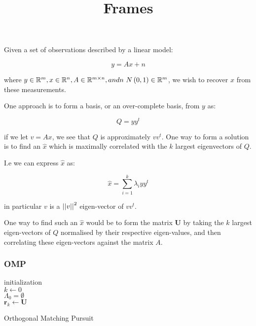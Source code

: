 \documentclass{article}
\title{Frames}
\begin{document}
\maketitle

Given a set of observations described by a linear model:

\begin{equation}
y = Ax + n 
\end{equation}

where \(y \in {\mathbb{R}}^{m}, x\in {\mathbb{R}}^n, A \in {\mathbb{R}}^{m \times n}, and n ~ N\left(0,1\right) \in {\mathbb{R}}^m\), we wish to recover \(x\) from these measurements. 

One approach is to form a basis, or an over-complete basis, from \(y\) as:

\begin{equation}
Q = yy^t
\end{equation}

if we let \(v = Ax\), we see that \(Q\) is approximately \(vv^t\). One way to form a solution is to find an \(\hat{x}\) which is maximally correlated with the \(k\) largest eigenvectors of \(Q\).

I.e we can express \(\hat{x}\) as:

\begin{equation}
\hat{x} = \sum_{i=1}^k \lambda_i yy^t
\end{equation}

in particular \(v\) is a \( \left|\left|v\right|\right|^2 \) eigen-vector of \(vv^t\).

One way to find such an \(\hat{x}\) would be to form the matrix \(\textbf{U}\) by taking the \(k\) largest eigen-vectors of \(Q\) normalised by their respective eigen-values, and then correlating these eigen-vectors against the matrix \(A\). 

\subsubsection*{OMP}

\begin{algorithm}[H]


 initialization \\
 \(k \leftarrow 0\) \\
 \(\Lambda_0 = \emptyset\) \\
 \(\textbf{r}_k \leftarrow \textbf{U}\) \;
 \caption{Orthogonal Matching Pursuit}
\end{algorithm}
\end{document}
